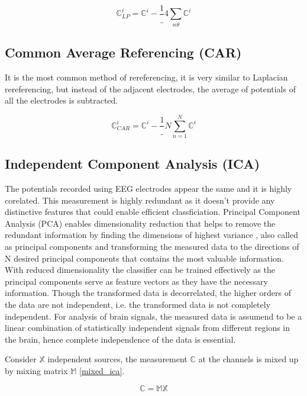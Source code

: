 \begin{equation} \label{eq:lap_eeg}
    \mathbb{C}^{i}_{LP} =  \mathbb{C}^{i} - \frac{1}_{4} \sum_{i \epsilon \theta} \mathbb{C}^{i}
\end{equation}

\subsection{Common Average Referencing (CAR)}
It is the most common method of rereferencing, it is very similar to Laplacian rereferencing, but instead of the adjacent electrodes, the average of potentials of all the electrodes
is subtracted.

\begin{equation} \label{eq:car_eeg}
    \mathbb{C}^{i}_{CAR} =  \mathbb{C}^{i} - \frac{1}_{N} \sum_{n = 1}^{N} \mathbb{C}^{i}
\end{equation}

\subsection{Independent Component Analysis (ICA)}
The potentials recorded using EEG electrodes appear the same and it is highly corelated. This measurement is highly redundant as it doesn't provide any distinctive features that could
enable efficient classficiation. Principal Component Analysis (PCA) enables dimensionality reduction that helps to remove the redundant information by finding the dimensions of highest variance
, also called as principal components and transforming the measured data to the directions of N desired principal components that contains the most valuable information. With reduced dimensionality
the classifier can be trained effectively as the principal components serve as feature vectors as they have the necessary information. Though the transformed data is decorrelated, the higher orders 
of the data are not independent, i.e. the transformed data is not completely independent. For analysis of brain signals, the measured data is assumend to be a linear combination of statistically
independent signals from different regions in the brain, hence complete independence of the data is essential.

Consider $\mathbb{X}$ independent sources, the measurement $\mathbb{C}$ at the channels is mixed up by mixing matrix $\mathbb{M}$ \ref{mixed_ica}.

\begin{equation} \label{eq:mixed_ica}
    \mathbb{C} = \mathbb{MX} 
\end{equation}

